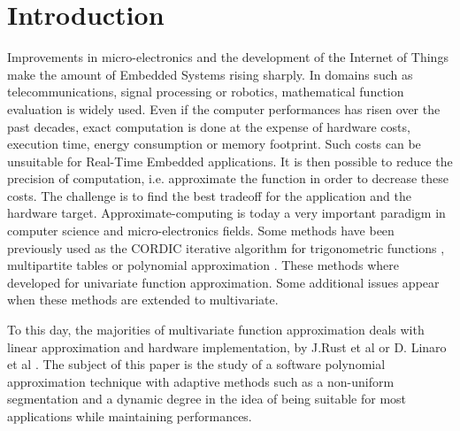 \documentclass[fleqn,10pt]{SelfArx} %
\affiliation{\textsuperscript{1}\textit{Department of Electronics and Computer Science, INSA Rennes, Rennes, France}} %
\affiliation{*\textbf{Corresponding author}: Mathieu.Percelay@insa-rennes.fr} %
\begin{document}
\flushbottom %

\maketitle %

\tableofcontents %

\thispagestyle{empty} %


\section{Introduction} %
Improvements in micro-electronics and the development of the Internet of Things make the amount of Embedded Systems rising sharply. In domains such as telecommunications, signal processing or robotics, mathematical function evaluation is widely used. Even if the computer performances has risen over the past decades, exact
computation is done at the expense of hardware costs, execution time, energy consumption or memory footprint. Such costs can be unsuitable for Real-Time Embedded applications.
It is then possible to reduce the precision of computation, i.e. approximate the function in order to decrease these costs. The challenge is to find the best tradeoff for the application and the hardware target. Approximate-computing is today a very important paradigm \cite{paradigm} in computer science and micro-electronics fields.
Some methods have been previously used as the CORDIC iterative algorithm for trigonometric functions \cite{cordic}, multipartite tables \cite{multipartite} or polynomial approximation \cite{juju}. These methods where developed for univariate function approximation. Some additional issues appear when these methods are extended to multivariate.

To this day, the majorities of multivariate function approximation deals with linear approximation and hardware implementation, by J.Rust et al \cite{encodedgradients} or D. Linaro et al \cite{genetic}. 
The subject of this paper is the study of a software polynomial approximation technique with adaptive methods such as a non-uniform segmentation and a dynamic degree in the idea of being suitable for most applications while maintaining performances. 
\end{document}

